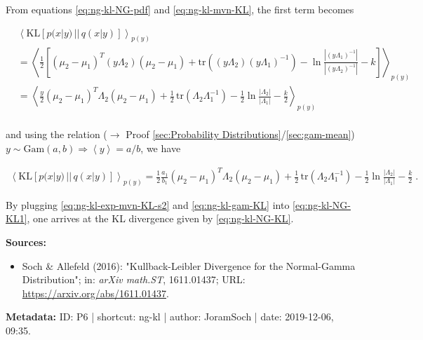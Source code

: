 \documentclass[a4paper,12pt,twoside]{book}
\begin{document}
\vspace{1em}
From equations \eqref{eq:ng-kl-NG-pdf} and \eqref{eq:ng-kl-mvn-KL}, the first term becomes

\begin{equation} \label{eq:ng-kl-exp-mvn-KL-s1}
\begin{split}
&\left\langle \mathrm{KL}[p(x|y)\,||\,q(x|y)] \right\rangle_{p(y)} \\
&= \left\langle \frac{1}{2} \left[ (\mu_2 - \mu_1)^T (y \Lambda_2) (\mu_2 - \mu_1) + \mathrm{tr}\left( (y \Lambda_2) (y \Lambda_1)^{-1} \right) - \ln \frac{|(y \Lambda_1)^{-1}|}{|(y \Lambda_2)^{-1}|} - k \right] \right\rangle_{p(y)} \\
&= \left\langle \frac{y}{2} (\mu_2 - \mu_1)^T \Lambda_2 (\mu_2 - \mu_1) + \frac{1}{2} \, \mathrm{tr}(\Lambda_2 \Lambda_1^{-1}) - \frac{1}{2} \ln \frac{|\Lambda_2|}{|\Lambda_1|} - \frac{k}{2} \right\rangle_{p(y)} \\
\end{split}
\end{equation}

and using the relation ($\rightarrow$ Proof \ref{sec:Probability Distributions}/\ref{sec:gam-mean}) $y \sim \mathrm{Gam}(a,b) \Rightarrow \left\langle y \right\rangle = a/b$, we have

\begin{equation} \label{eq:ng-kl-exp-mvn-KL-s2}
\begin{split}
\left\langle \mathrm{KL}[p(x|y)\,||\,q(x|y)] \right\rangle_{p(y)} = \frac{1}{2} \frac{a_1}{b_1} (\mu_2 - \mu_1)^T \Lambda_2 (\mu_2 - \mu_1) + \frac{1}{2} \, \mathrm{tr}(\Lambda_2 \Lambda_1^{-1}) - \frac{1}{2} \ln \frac{|\Lambda_2|}{|\Lambda_1|} - \frac{k}{2} \; .
\end{split}
\end{equation}

By plugging \eqref{eq:ng-kl-exp-mvn-KL-s2} and \eqref{eq:ng-kl-gam-KL} into \eqref{eq:ng-kl-NG-KL1}, one arrives at the KL divergence given by \eqref{eq:ng-kl-NG-KL}.


\vspace{1em}
\textbf{Sources:}
\begin{itemize}
\item Soch \& Allefeld (2016): "Kullback-Leibler Divergence for the Normal-Gamma Distribution"; in: \textit{arXiv math.ST}, 1611.01437; URL: \url{https://arxiv.org/abs/1611.01437}.
\end{itemize}


\vspace{1em}
\textbf{Metadata:} ID: P6 | shortcut: ng-kl | author: JoramSoch | date: 2019-12-06, 09:35.
\vspace{1em}
\end{document}
